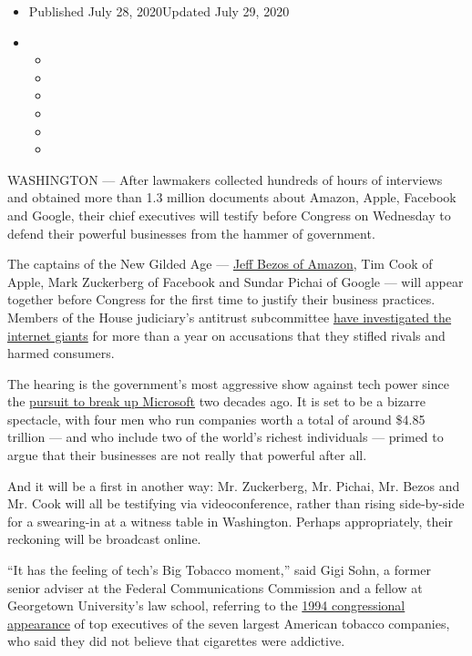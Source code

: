 \begin{itemize}
\item
  Published July 28, 2020Updated July 29, 2020
\item
  \begin{itemize}
  \item
  \item
  \item
  \item
  \item
  \item
  \end{itemize}
\end{itemize}

WASHINGTON --- After lawmakers collected hundreds of hours of interviews
and obtained more than 1.3 million documents about Amazon, Apple,
Facebook and Google, their chief executives will testify before Congress
on Wednesday to defend their powerful businesses from the hammer of
government.

The captains of the New Gilded Age ---
\href{https://www.nytimes3xbfgragh.onion/2020/07/27/business/jeff-bezos-amazon-congress.html}{Jeff
Bezos of Amazon}, Tim Cook of Apple, Mark Zuckerberg of Facebook and
Sundar Pichai of Google --- will appear together before Congress for the
first time to justify their business practices. Members of the House
judiciary's antitrust subcommittee
\href{https://www.nytimes3xbfgragh.onion/2019/06/11/technology/antitrust-hearing.html}{have
investigated the internet giants} for more than a year on accusations
that they stifled rivals and harmed consumers.

The hearing is the government's most aggressive show against tech power
since the
\href{https://www.nytimes3xbfgragh.onion/2000/04/04/business/us-vs-microsoft-overview-us-judge-says-microsoft-violated-antitrust-laws-with.html}{pursuit
to break up Microsoft} two decades ago. It is set to be a bizarre
spectacle, with four men who run companies worth a total of around
\$4.85 trillion --- and who include two of the world's richest
individuals --- primed to argue that their businesses are not really
that powerful after all.

And it will be a first in another way: Mr. Zuckerberg, Mr. Pichai, Mr.
Bezos and Mr. Cook will all be testifying via videoconference, rather
than rising side-by-side for a swearing-in at a witness table in
Washington. Perhaps appropriately, their reckoning will be broadcast
online.

``It has the feeling of tech's Big Tobacco moment,'' said Gigi Sohn, a
former senior adviser at the Federal Communications Commission and a
fellow at Georgetown University's law school, referring to the
\href{https://www.nytimes3xbfgragh.onion/1994/04/15/us/tobacco-chiefs-say-cigarettes-aren-t-addictive.html}{1994
congressional appearance} of top executives of the seven largest
American tobacco companies, who said they did not believe that
cigarettes were addictive.

